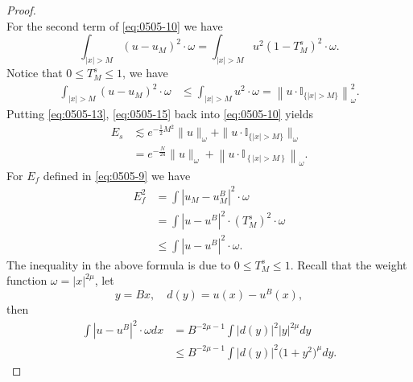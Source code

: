 \documentclass[pdflatex,sn-aps]{sn-jnl}%
\theoremstyle{thmstyleone}%
\theoremstyle{thmstyletwo}%
\theoremstyle{thmstylethree}%
\begin{document}
\begin{proof}
\begin{equation}
  \end{equation}
  For the second term of \eqref{eq:0505-10} we have
  \begin{equation}\label{eq:0505-14}
    \int_{|x|>M}\left(u-u_M\right)^2 \cdot \omega=\int_{|x|>M} u^2\left(1-T_M^s\right)^2 \cdot \omega.
  \end{equation}
  Notice that $0 \leqslant T_M^s \leqslant 1$, we have
  \begin{equation}\label{eq:0505-15}
    \begin{aligned}
    \int_{|x|>M}\left(u-u_M\right)^2 \cdot \omega & \leqslant \int_{|x|>M} u^2 \cdot \omega 
     =\left\|u \cdot \mathbb{I}_{\{|x|>M\}}\right\|_\omega^2.
    \end{aligned}
  \end{equation}
  Putting \eqref{eq:0505-13}, \eqref{eq:0505-15} back into \eqref{eq:0505-10}
  yields
  \begin{equation}\label{eq:0505-16}
    \begin{aligned}
    E_s & \lesssim e^{-\frac{1}{2} M^2}\|u\|_\omega+\|u \cdot \mathbb{I}_{\{|x|>M\}}\|_\omega \\
    & =e^{-\frac{N}{24}}\|u\|_\omega+\left\|u \cdot \mathbb{I}_{\left\{|x|>M\right\}}\right\|_\omega.
    \end{aligned}
  \end{equation}
  For $E_f$ defined in \eqref{eq:0505-9} we have
  \begin{equation}\label{eq:0505-17}
    \begin{aligned}
    E_f^2 & =\int\left|u_M-u_M^B\right|^2 \cdot \omega \\
    & =\int\left|u-u^B\right|^2 \cdot\left(T_M^s\right)^2 \cdot \omega \\
    & \leqslant \int\left|u-u^B\right|^2 \cdot \omega.
    \end{aligned}
  \end{equation}
  The inequality in the above formula is due to $0 \leqslant T_M^s \leqslant 1$.
  Recall that the weight function $\omega = |x|^{2\mu}$, let
  \begin{equation}\label{eq:1111-0.5}
    y=B x, \quad d(y)=u(x)-u^B(x),
  \end{equation}
  then 
  \begin{equation}\label{eq:1111-1}
    \begin{aligned}
     \int\left|u-u^B\right|^2 \cdot \omega d x 
    &=  B^{-2 \mu-1} \int|d(y)|^2|y|^{2 \mu} d y \\
    &\leqslant  B^{-2 \mu-1} \int|d(y)|^2\bigl(1+y^2\bigr)^\mu d y.

\end{aligned}
\end{equation}
\end{proof}
\end{document}
